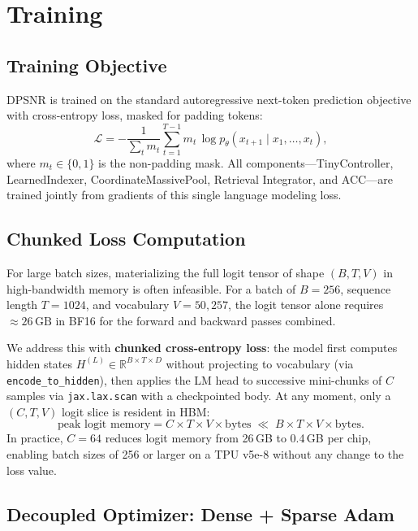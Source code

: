 \documentclass[11pt]{article}
\begin{document}
\section{Training}
\label{sec:training}

\subsection{Training Objective}

DPSNR is trained on the standard autoregressive next-token prediction objective
with cross-entropy loss, masked for padding tokens:
\begin{equation}
  \mathcal{L} = -\frac{1}{\sum_t m_t}
    \sum_{t=1}^{T-1} m_t\,\log p_\theta(x_{t+1} \mid x_1,\ldots,x_t),
\end{equation}
where $m_t \in \{0,1\}$ is the non-padding mask.
All components—TinyController, LearnedIndexer, CoordinateMassivePool, Retrieval
Integrator, and ACC—are trained jointly from gradients of this single
language modeling loss.

\subsection{Chunked Loss Computation}
\label{sec:chunked_loss}

For large batch sizes, materializing the full logit tensor of shape
$(B, T, V)$ in high-bandwidth memory is often infeasible.
For a batch of $B=256$, sequence length $T=1024$, and vocabulary $V=50{,}257$,
the logit tensor alone requires $\approx 26\,\text{GB}$ in BF16 for the
forward and backward passes combined.

We address this with \textbf{chunked cross-entropy loss}: the model first
computes hidden states $H^{(L)} \in \mathbb{R}^{B \times T \times D}$ without
projecting to vocabulary (via \texttt{encode\_to\_hidden}),
then applies the LM head to successive mini-chunks of $C$ samples via
\texttt{jax.lax.scan} with a checkpointed body.
At any moment, only a $(C, T, V)$ logit slice is resident in HBM:
\begin{equation}
  \text{peak logit memory} = C \times T \times V \times \text{bytes}
  \;\ll\; B \times T \times V \times \text{bytes}.
\end{equation}
In practice, $C = 64$ reduces logit memory from 26\,GB to 0.4\,GB per chip,
enabling batch sizes of 256 or larger on a TPU v5e-8 without any change to
the loss value.

\subsection{Decoupled Optimizer: Dense + Sparse Adam}
\label{sec:optimizer}
\end{document}
